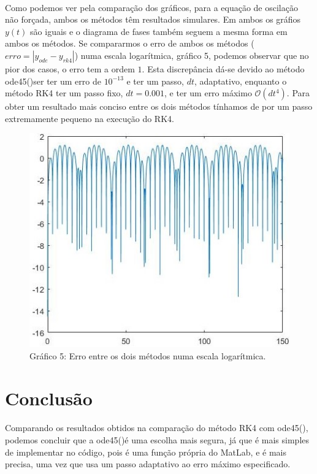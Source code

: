 \documentclass[a4paper, 11pt]{article}
\newcommand{\ode}{{\fontfamily{pcr}\selectfont ode45()}}
\begin{document}
	\paragraph{}
	Como podemos ver pela comparação dos gráficos, para a equação de oscilação não forçada, ambos os métodos têm resultados simulares. Em ambos os gráfios $y(t)$ são iguais e o diagrama de fases também seguem a mesma forma em ambos os métodos. Se compararmos o erro de ambos os métodos ($erro=\left|y_{ode}-y_{rk4}\right|$) numa escala logarítmica, gráfico 5, podemos observar que no pior dos casos, o erro tem a ordem $1$. Esta discrepância dá-se devido ao método \ode ser ter um erro de $10^{-13}$ e ter um passo, $dt$, adaptativo, enquanto o método RK4 ter um passo fixo, $dt=0.001$, e ter um erro máximo $\mathcal{O}(dt^{4})$. Para obter um resultado mais conciso entre os dois métodos tínhamos de por um passo extremamente pequeno na execução do RK4.
	\begin{figure}[h]
		\centering
		\captionsetup{labelformat=empty}
		\includegraphics[scale=0.6]{erro2}
		\caption{\scriptsize Gráfico 5: Erro entre os dois métodos numa escala logarítmica.}
	\end{figure}
	\section{Conclusão}
	\paragraph{}
	Comparando os resultados obtidos na comparação do método RK4 com \ode, podemos concluir que a \ode é uma escolha mais segura, já que é mais simples de implementar no código, pois é uma função própria do MatLab, e é mais precisa, uma vez que usa um passo adaptativo ao erro máximo especificado.
\end{document}

